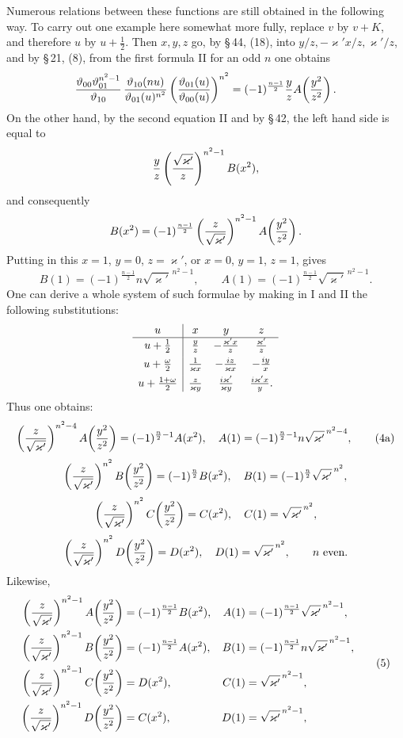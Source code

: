 \documentclass[11pt]{article}
\begin{document}
Numerous relations between these functions are still obtained in the following way. To
carry out one example here somewhat more fully, replace $v$ by $v+K$, and therefore $u$
by $u+\frac12$. Then $x,y,z$ go, by \S\,44, (18), into
$y/z,-\varkappa' x/z,\varkappa'/z$, and by \S\,21, (8), from the first formula II for
an odd $n$ one obtains
\[
{\vartheta_{00}\vartheta_{01}^{n^2-1}\over\vartheta_{10}}\,
{\vartheta_{10}(nu)\over\vartheta_{01}(u)^{n^2}}
\left({\vartheta_{01}(u)\over\vartheta_{00}(u)}\right)^{n^2}
=(-1)^{\frac{n-1}{2}}{y\over z} A\!\left({y^2\over z^2}\right).
\]
On the other hand, by the second equation II and by \S\,42, the left hand side is equal to
\[
{y\over z}\left({\sqrt{\varkappa'}\over z}\right)^{n^2-1}B(x^2),
\]
and consequently
\[
B(x^2)=(-1)^{\frac{n-1}{2}}\left({z\over\sqrt{\varkappa'}}\right)^{n^2-1}
A\!\left({y^2\over z^2}\right).
\]
Putting in this $x=1$, $y=0$, $z=\varkappa'$, or $x=0$, $y=1$, $z=1$, gives
\[
B(1)=(-1)^{\frac{n-1}{2}}n\sqrt{\varkappa'}^{\,n^2-1},
\qquad
A(1)=(-1)^{\frac{n-1}{2}}\sqrt{\varkappa'}^{\,n^2-1}.
\]
One can derive a whole system of such formulae by making in I and II the following
substitutions:
\[
\begin{array}{c|ccc}
u&x&y&z\\ \hline
u+\frac12&{y\over z}&-{\varkappa' x\over z}&{\varkappa'\over z}\\[0.4em]
u+\frac{\omega}{2}&{1\over\varkappa x}&-{i z\over\varkappa x}&-{i y\over x}\\[0.4em]
u+\frac{1+\omega}{2}&{z\over\varkappa y}&{i\varkappa'\over\varkappa y}&{i\varkappa' x\over y}.
\end{array}
\]
Thus one obtains:
\begin{equation}
\left({z\over\sqrt{\varkappa'}}\right)^{n^2-4}A\!\left({y^2\over z^2}\right)
=(-1)^{\frac n2-1}A(x^2),\quad
A(1)=(-1)^{\frac n2-1}n\sqrt{\varkappa'}^{\,n^2-4},
\tag{4a}
\end{equation}
\[
\left({z\over\sqrt{\varkappa'}}\right)^{n^2}B\!\left({y^2\over z^2}\right)
=(-1)^{\frac n2}B(x^2),\quad
B(1)=(-1)^{\frac n2}\sqrt{\varkappa'}^{\,n^2},
\]
\[
\left({z\over\sqrt{\varkappa'}}\right)^{n^2}C\!\left({y^2\over z^2}\right)
=C(x^2),\quad C(1)=\sqrt{\varkappa'}^{\,n^2},
\]
\[
\left({z\over\sqrt{\varkappa'}}\right)^{n^2}D\!\left({y^2\over z^2}\right)
=D(x^2),\quad D(1)=\sqrt{\varkappa'}^{\,n^2},
\qquad n\ \text{even}.
\]
Likewise,
\begin{equation}
\begin{aligned}
\left({z\over\sqrt{\varkappa'}}\right)^{n^2-1}A\!\left({y^2\over z^2}\right)
&=(-1)^{\frac{n-1}{2}}B(x^2),
& A(1)&=(-1)^{\frac{n-1}{2}}\sqrt{\varkappa'}^{\,n^2-1},\\
\left({z\over\sqrt{\varkappa'}}\right)^{n^2-1}B\!\left({y^2\over z^2}\right)
&=(-1)^{\frac{n-1}{2}}A(x^2),
& B(1)&=(-1)^{\frac{n-1}{2}}n\sqrt{\varkappa'}^{\,n^2-1},\\
\left({z\over\sqrt{\varkappa'}}\right)^{n^2-1}C\!\left({y^2\over z^2}\right)
&=D(x^2),
& C(1)&=\sqrt{\varkappa'}^{\,n^2-1},\\
\left({z\over\sqrt{\varkappa'}}\right)^{n^2-1}D\!\left({y^2\over z^2}\right)
&=C(x^2),
& D(1)&=\sqrt{\varkappa'}^{\,n^2-1},
\end{aligned}
\tag{5}
\end{equation}
\end{document}
